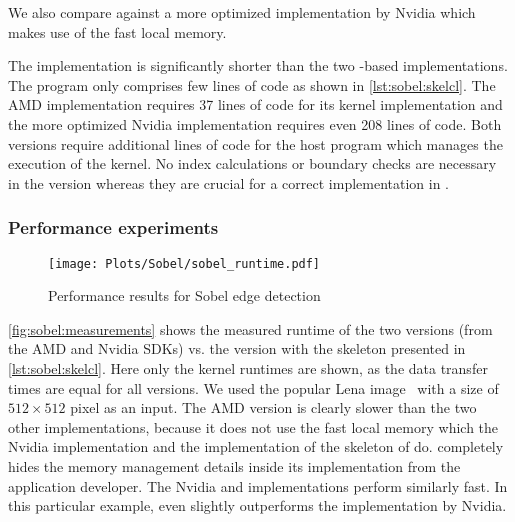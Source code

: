 We also compare against a more optimized \OpenCL implementation by Nvidia which makes use of the fast local \GPU memory.

The \SkelCL implementation is significantly shorter than the two \OpenCL-based implementations.
The \SkelCL program only comprises few lines of code as shown in \autoref{lst:sobel:skelcl}.
The AMD implementation requires 37 lines of code for its kernel implementation and the more optimized Nvidia implementation requires even 208 lines of code.
Both versions require additional lines of code for the host program which manages the execution of the \OpenCL kernel.
No index calculations or boundary checks are necessary in the \SkelCL version whereas they are crucial for a correct implementation in \OpenCL.

\subsubsection*{Performance experiments}

\begin{figure}[tbp]
  \vspace{.5em}
  \centering
  \texttt{[image: Plots/Sobel/sobel\_runtime.pdf]}
  \caption{Performance results for Sobel edge detection}
  \label{fig:sobel:measurements}
\end{figure}
\autoref{fig:sobel:measurements} shows the measured runtime of the two \OpenCL versions (from the AMD and Nvidia SDKs) vs. the \SkelCL version with the \stencil skeleton presented in \autoref{lst:sobel:skelcl}.
Here only the kernel runtimes are shown, as the data transfer times are equal for all versions.
We used the popular Lena image~\cite{Lena} with a size of $512\times 512$ pixel as an input.
The AMD version is clearly slower than the two other implementations, because it does not use the fast local memory which the Nvidia implementation and the  implementation of the \stencil skeleton of \SkelCL do.
\SkelCL completely hides the memory management details inside its implementation from the application developer.
The Nvidia and \SkelCL implementations perform similarly fast.
In this particular example, \SkelCL even slightly outperforms the implementation by Nvidia.










